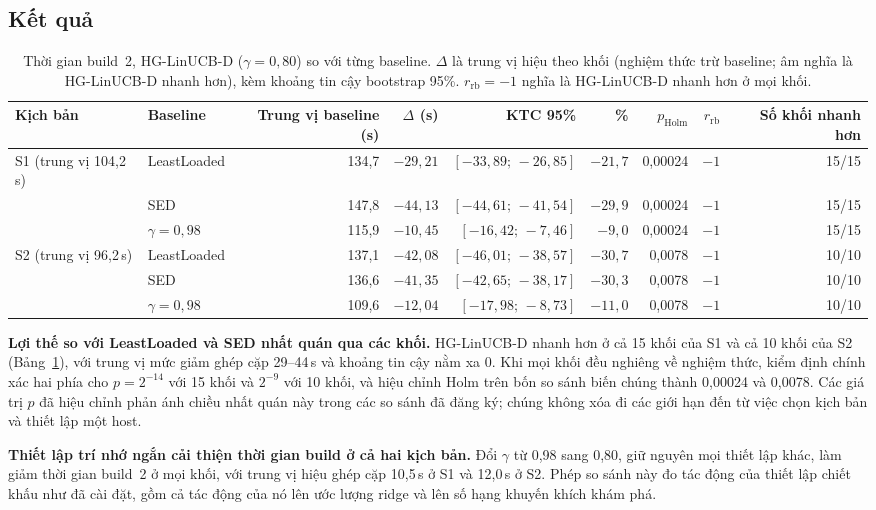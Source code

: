 \documentclass[final,5p,times,twocolumn]{elsarticle}
\begin{document}
\subsection{Kết quả}
\label{sec:results}

\begin{table}[t]
\centering
\caption{Thời gian build~2, HG-LinUCB-D ($\gamma=0{,}80$) so với từng baseline. $\Delta$ là trung vị hiệu theo khối (nghiệm thức trừ baseline; âm nghĩa là HG-LinUCB-D nhanh hơn), kèm khoảng tin cậy bootstrap 95\%. $r_{\text{rb}}=-1$ nghĩa là HG-LinUCB-D nhanh hơn ở mọi khối.}
\label{tab:main}
\footnotesize
\begin{tabular}{llrrrrrrr}
\toprule
Kịch bản & Baseline & Trung vị baseline (s) & $\Delta$ (s) & KTC 95\% & \% & $p_{\text{Holm}}$ & $r_{\text{rb}}$ & Số khối nhanh hơn \\
\midrule
S1 (trung vị 104,2\,s) & LeastLoaded & 134,7 & $-29{,}21$ & $[-33{,}89;\,-26{,}85]$ & $-21{,}7$ & 0,00024 & $-1$ & 15/15 \\
 & SED & 147,8 & $-44{,}13$ & $[-44{,}61;\,-41{,}54]$ & $-29{,}9$ & 0,00024 & $-1$ & 15/15 \\
 & $\gamma=0{,}98$ & 115,9 & $-10{,}45$ & $[-16{,}42;\,-7{,}46]$ & $-9{,}0$ & 0,00024 & $-1$ & 15/15 \\
\midrule
S2 (trung vị 96,2\,s) & LeastLoaded & 137,1 & $-42{,}08$ & $[-46{,}01;\,-38{,}57]$ & $-30{,}7$ & 0,0078 & $-1$ & 10/10 \\
 & SED & 136,6 & $-41{,}35$ & $[-42{,}65;\,-38{,}17]$ & $-30{,}3$ & 0,0078 & $-1$ & 10/10 \\
 & $\gamma=0{,}98$ & 109,6 & $-12{,}04$ & $[-17{,}98;\,-8{,}73]$ & $-11{,}0$ & 0,0078 & $-1$ & 10/10 \\
\bottomrule
\end{tabular}
\end{table}

\textbf{Lợi thế so với LeastLoaded và SED nhất quán qua các khối.} HG-LinUCB-D nhanh hơn ở cả 15 khối của S1 và cả 10 khối của S2 (Bảng~\ref{tab:main}), với trung vị mức giảm ghép cặp 29--44\,s và khoảng tin cậy nằm xa 0. Khi mọi khối đều nghiêng về nghiệm thức, kiểm định chính xác hai phía cho $p=2^{-14}$ với 15 khối và $2^{-9}$ với 10 khối, và hiệu chỉnh Holm trên bốn so sánh biến chúng thành 0,00024 và 0,0078. Các giá trị $p$ đã hiệu chỉnh phản ánh chiều nhất quán này trong các so sánh đã đăng ký; chúng không xóa đi các giới hạn đến từ việc chọn kịch bản và thiết lập một host.

\textbf{Thiết lập trí nhớ ngắn cải thiện thời gian build ở cả hai kịch bản.} Đổi $\gamma$ từ 0,98 sang 0,80, giữ nguyên mọi thiết lập khác, làm giảm thời gian build~2 ở mọi khối, với trung vị hiệu ghép cặp 10,5\,s ở S1 và 12,0\,s ở S2. Phép so sánh này đo tác động của thiết lập chiết khấu như đã cài đặt, gồm cả tác động của nó lên ước lượng ridge và lên số hạng khuyến khích khám phá.
\end{document}
